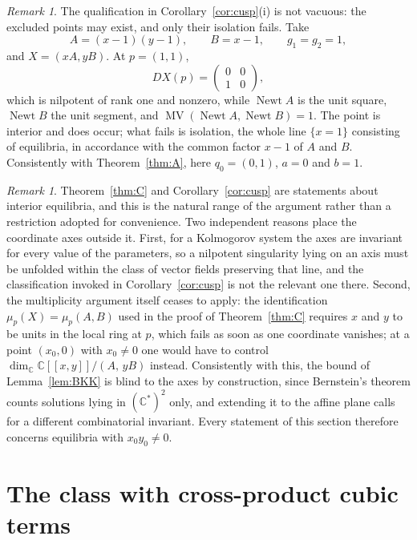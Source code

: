\documentclass[12pt]{article}
\theoremstyle{plain}
\theoremstyle{definition}
\theoremstyle{remark}
\newtheorem{remark}[theorem]{Remark}
\newcommand{\C}{\mathbb{C}}
\DeclareMathOperator{\MV}{MV}
\DeclareMathOperator{\Newt}{Newt}
\begin{document}
	\begin{remark}\label{rem:notvacuous}
		The qualification in Corollary~\ref{cor:cusp}(i) is not vacuous: the
		excluded points may exist, and only their isolation fails.  Take
		\[
		A=(x-1)(y-1),\qquad B=x-1,\qquad g_{1}=g_{2}=1,
		\]
		and $X=(xA,yB)$.  At $p=(1,1)$,
		\[
		DX(p)=\begin{pmatrix}0&0\\1&0\end{pmatrix},
		\]
		which is nilpotent of rank one and nonzero, while $\Newt A$ is the unit
		square, $\Newt B$ the unit segment, and
		$\MV(\Newt A,\Newt B)=1$.  The point is interior and does occur; what
		fails is isolation, the whole line $\{x=1\}$ consisting of equilibria,
		in accordance with the common factor $x-1$ of $A$ and $B$.  Consistently
		with Theorem~\ref{thm:A}, here $q_{0}=(0,1)$, $a=0$ and $b=1$.
	\end{remark}
	
	\begin{remark}\label{rem:interior}
		Theorem~\ref{thm:C} and Corollary~\ref{cor:cusp} are statements about
		interior equilibria, and this is the natural range of the argument
		rather than a restriction adopted for convenience.  Two independent
		reasons place the coordinate axes outside it.  First, for a Kolmogorov
		system the axes are invariant for every value of the parameters, so a
		nilpotent singularity lying on an axis must be unfolded within the
		class of vector fields preserving that line, and the classification
		invoked in Corollary~\ref{cor:cusp} is not the relevant one there.
		Second, the multiplicity argument itself ceases to apply: the
		identification $\mu_{p}(X)=\mu_{p}(A,B)$ used in the proof of
		Theorem~\ref{thm:C} requires $x$ and $y$ to be units in the local ring
		at $p$, which fails as soon as one coordinate vanishes; at a point
		$(x_{0},0)$ with $x_{0}\neq0$ one would have to control
		$\dim_{\C}\C[[x,y]]/(A,\,yB)$ instead.  Consistently with this, the
		bound of Lemma~\ref{lem:BKK} is blind to the axes by construction,
		since Bernstein's theorem counts solutions lying in $(\C^{*})^{2}$
		only, and extending it to the affine plane calls for a different
		combinatorial invariant.  Every statement of this section therefore
		concerns equilibria with $x_{0}y_{0}\neq0$.
	\end{remark}
	
	
	\section{The class with cross-product cubic terms}
	\label{sec:family}
	
\end{document}

